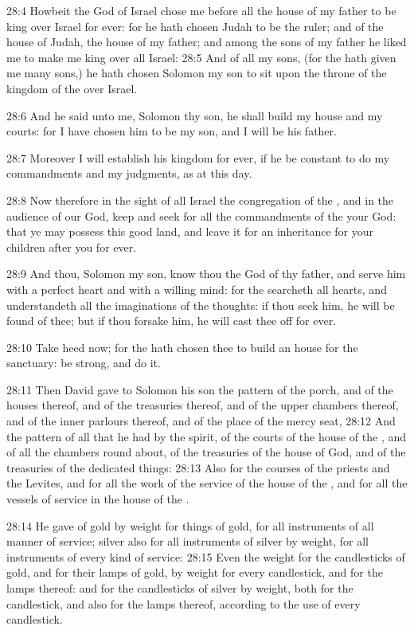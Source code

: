 28:4 Howbeit the \LORD God of Israel chose me before all the house of my father to be king over Israel for ever: for he hath chosen Judah to be the ruler; and of the house of Judah, the house of my father; and among the sons of my father he liked me to make me king over all Israel: 28:5 And of all my sons, (for the \LORD hath given me many sons,) he hath chosen Solomon my son to sit upon the throne of the kingdom of the \LORD over Israel.

28:6 And he said unto me, Solomon thy son, he shall build my house and my courts: for I have chosen him to be my son, and I will be his father.

28:7 Moreover I will establish his kingdom for ever, if he be constant to do my commandments and my judgments, as at this day.

28:8 Now therefore in the sight of all Israel the congregation of the \LORD, and in the audience of our God, keep and seek for all the commandments of the \LORD your God: that ye may possess this good land, and leave it for an inheritance for your children after you for ever.

28:9 And thou, Solomon my son, know thou the God of thy father, and serve him with a perfect heart and with a willing mind: for the \LORD searcheth all hearts, and understandeth all the imaginations of the thoughts: if thou seek him, he will be found of thee; but if thou forsake him, he will cast thee off for ever.

28:10 Take heed now; for the \LORD hath chosen thee to build an house for the sanctuary: be strong, and do it.

28:11 Then David gave to Solomon his son the pattern of the porch, and of the houses thereof, and of the treasuries thereof, and of the upper chambers thereof, and of the inner parlours thereof, and of the place of the mercy seat, 28:12 And the pattern of all that he had by the spirit, of the courts of the house of the \LORD, and of all the chambers round about, of the treasuries of the house of God, and of the treasuries of the dedicated things: 28:13 Also for the courses of the priests and the Levites, and for all the work of the service of the house of the \LORD, and for all the vessels of service in the house of the \LORD.

28:14 He gave of gold by weight for things of gold, for all instruments of all manner of service; silver also for all instruments of silver by weight, for all instruments of every kind of service: 28:15 Even the weight for the candlesticks of gold, and for their lamps of gold, by weight for every candlestick, and for the lamps thereof: and for the candlesticks of silver by weight, both for the candlestick, and also for the lamps thereof, according to the use of every candlestick.

